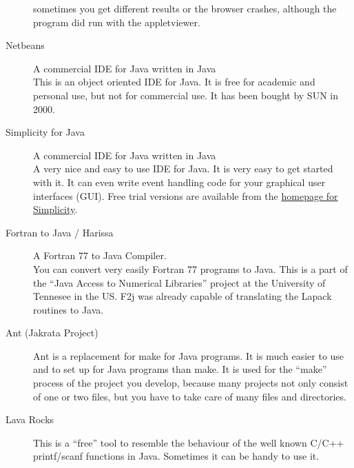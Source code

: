 \begin{description}
  sometimes you get different results or the browser crashes,
  although the program did run with the appletviewer.
\item[Netbeans] A commercial IDE for Java written in Java \\
  This is an object oriented IDE for Java. It is free for academic and 
  personal use, but not for commercial use. It has been bought by SUN
  in 2000.
\item[Simplicity for Java] 
  A commercial IDE for Java written in  Java\\
  A very nice and easy to use IDE for Java. It is very easy to get started
  with it. It can even write event handling code for your 
  graphical user interfaces (GUI). Free trial versions are available
  from the \href{http://www.datarepresentations.com/}{homepage for Simplicity}.
\item[Fortran to Java / Harissa]  A Fortran 77 to Java Compiler. \\
  You can convert very easily Fortran 77 programs to Java. This is a part of the
  ``Java Access to Numerical Libraries'' project at the University of 
  Tennesee in the US. F2j was already capable of translating the
  Lapack routines to Java.
\item[Ant (Jakrata Project)] Ant is a replacement for make for Java programs.
  It is much easier to use and to set up for Java programs than make.
  It is used for the ``make'' process of the project you develop, because many
  projects not only consist of one or two files, but you have to take care
  of many files and directories.
\item[Lava Rocks] This is a ``free'' tool to resemble the behaviour of the
  well known C/C++ printf/scanf functions in Java. Sometimes it can be handy
  to use it.
\end{description}

